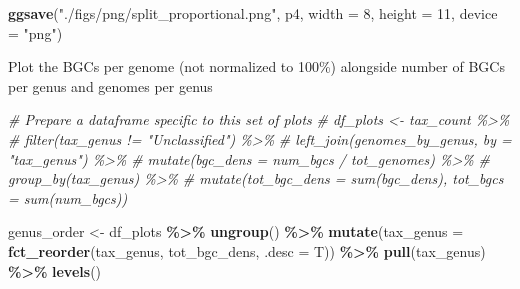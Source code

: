 \documentclass[
]{article}
\newenvironment{Shaded}{\begin{snugshade}}{\end{snugshade}}
\newcommand{\AttributeTok}[1]{\textcolor[rgb]{0.13,0.29,0.53}{#1}}
\newcommand{\CommentTok}[1]{\textcolor[rgb]{0.56,0.35,0.01}{\textit{#1}}}
\newcommand{\DecValTok}[1]{\textcolor[rgb]{0.00,0.00,0.81}{#1}}
\newcommand{\FunctionTok}[1]{\textcolor[rgb]{0.13,0.29,0.53}{\textbf{#1}}}
\newcommand{\NormalTok}[1]{#1}
\newcommand{\OtherTok}[1]{\textcolor[rgb]{0.56,0.35,0.01}{#1}}
\newcommand{\SpecialCharTok}[1]{\textcolor[rgb]{0.81,0.36,0.00}{\textbf{#1}}}
\newcommand{\StringTok}[1]{\textcolor[rgb]{0.31,0.60,0.02}{#1}}
\begin{document}
\begin{Shaded}
\begin{Highlighting}[]
\FunctionTok{ggsave}\NormalTok{(}\StringTok{"./figs/png/split\_proportional.png"}\NormalTok{, p4, }\AttributeTok{width =} \DecValTok{8}\NormalTok{, }\AttributeTok{height =} \DecValTok{11}\NormalTok{, }\AttributeTok{device =} \StringTok{"png"}\NormalTok{)}
\end{Highlighting}
\end{Shaded}

Plot the BGCs per genome (not normalized to 100\%) alongside number of
BGCs per genus and genomes per genus

\begin{Shaded}
\begin{Highlighting}[]
\CommentTok{\# Prepare a dataframe specific to this set of plots}
\CommentTok{\# df\_plots \textless{}{-} tax\_count \%\textgreater{}\%}
\CommentTok{\#   filter(tax\_genus != "Unclassified") \%\textgreater{}\%}
\CommentTok{\#   left\_join(genomes\_by\_genus, by = "tax\_genus") \%\textgreater{}\%}
\CommentTok{\#   mutate(bgc\_dens = num\_bgcs / tot\_genomes) \%\textgreater{}\%}
\CommentTok{\#   group\_by(tax\_genus) \%\textgreater{}\%}
\CommentTok{\#   mutate(tot\_bgc\_dens = sum(bgc\_dens), tot\_bgcs = sum(num\_bgcs))}

\NormalTok{genus\_order }\OtherTok{\textless{}{-}}\NormalTok{ df\_plots }\SpecialCharTok{\%\textgreater{}\%} \FunctionTok{ungroup}\NormalTok{() }\SpecialCharTok{\%\textgreater{}\%} \FunctionTok{mutate}\NormalTok{(}\AttributeTok{tax\_genus =} \FunctionTok{fct\_reorder}\NormalTok{(tax\_genus, tot\_bgc\_dens, }\AttributeTok{.desc =}\NormalTok{ T)) }\SpecialCharTok{\%\textgreater{}\%} \FunctionTok{pull}\NormalTok{(tax\_genus) }\SpecialCharTok{\%\textgreater{}\%} \FunctionTok{levels}\NormalTok{()}


\end{Highlighting}
\end{Shaded}
\end{document}
